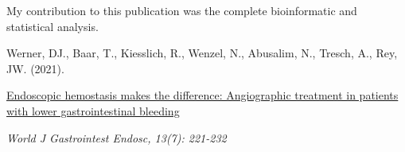 
\vfill
\noindent My contribution to this publication was the complete bioinformatic
and statistical analysis.\nopagebreak
\medskip
\begin{tcolorbox}[
  boxrule=0pt, leftrule=1pt, colframe=s-blue, colback=white, sharp corners=all]%
  \raggedright
  Werner, DJ., Baar, T., Kiesslich, R., Wenzel, N., Abusalim, N., Tresch, A.,
  Rey, JW. (2021).
  
  \smallskip
  \href{https://www.wjgnet.com/1948-5190/full/v13/i7/221.htm}
    {Endoscopic hemostasis makes the difference: Angiographic treatment in
    patients with lower gastrointestinal bleeding}

  \smallskip
  \textit{World J Gastrointest Endosc, 13(7): 221-232}
\end{tcolorbox}


% 
